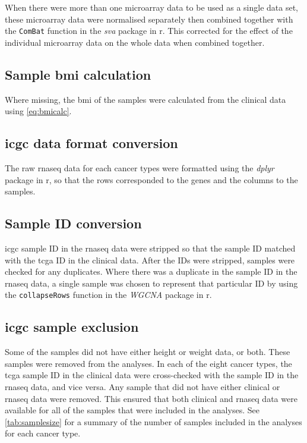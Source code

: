 When there were more than one microarray data to be used as a single data set, these microarray data were normalised separately then combined together with the \texttt{ComBat} function in the \textit{sva} package in \gls{r}.
This corrected for the effect of the individual microarray data on the whole data when combined together.

\subsection{Sample \gls{bmi} calculation}
\label{sub:sample_bmi_calculation}

Where missing, the \gls{bmi} of the samples were calculated from the clinical data using \cref{eq:bmicalc}.

\subsection{\gls{icgc} data format conversion}
\label{sub:icgc_data_format_conversion}

The raw \gls{rnaseq} data for each cancer types were formatted using the \textit{dplyr} package in \gls{r}, so that the rows corresponded to the genes and the columns to the samples.

\subsection{Sample ID conversion}
\label{sub:sample_id_conversion}

\gls{icgc} sample ID in the \gls{rnaseq} data were stripped so that the sample ID matched with the \gls{tcga} ID in the clinical data.
After the IDs were stripped, samples were checked for any duplicates.
Where there was a duplicate in the sample ID in the \gls{rnaseq} data, a single sample was chosen to represent that particular ID by using the \texttt{collapseRows} function in the \textit{WGCNA} package in \gls{r}.

\subsection{\gls{icgc} sample exclusion}
\label{sub:icgc_sample_exclusion}

Some of the samples did not have either height or weight data, or both.
These samples were removed from the analyses.
In each of the eight cancer types, the \gls{tcga} sample ID in the clinical data were cross-checked with the sample ID in the \gls{rnaseq} data, and vice versa.
Any sample that did not have either clinical or \gls{rnaseq} data were removed.
This ensured that both clinical and \gls{rnaseq} data were available for all of the samples that were included in the analyses.
See \cref{tab:samplesize} for a summary of the number of samples included in the analyses for each cancer type.

